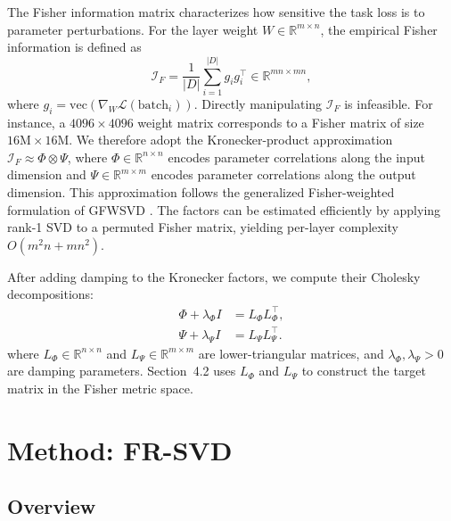 \documentclass[a4paper,fleqn]{cas-dc}
\begin{document}
The Fisher information matrix characterizes how sensitive the task loss is to parameter perturbations. For the layer weight $W \in \mathbb{R}^{m \times n}$, the empirical Fisher information is defined as
\begin{equation}
\mathcal{I}_F = \frac{1}{|D|} \sum_{i=1}^{|D|} g_i g_i^\top \in \mathbb{R}^{mn \times mn},
\end{equation}
where $g_i = \mathrm{vec}(\nabla_W \mathcal{L}(\mathrm{batch}_i))$. Directly manipulating $\mathcal{I}_F$ is infeasible. For instance, a $4096 \times 4096$ weight matrix corresponds to a Fisher matrix of size $16\text{M} \times 16\text{M}$. We therefore adopt the Kronecker-product approximation \citep{grosse2016kfac} $\mathcal{I}_F \approx \Phi \otimes \Psi$, where $\Phi \in \mathbb{R}^{n \times n}$ encodes parameter correlations along the input dimension and $\Psi \in \mathbb{R}^{m \times m}$ encodes parameter correlations along the output dimension. This approximation follows the generalized Fisher-weighted formulation of GFWSVD \citep{chekalina2025gfwsvd}. The factors can be estimated efficiently by applying rank-1 SVD to a permuted Fisher matrix, yielding per-layer complexity $O(m^2 n + mn^2)$.

After adding damping to the Kronecker factors, we compute their Cholesky decompositions:
\begin{equation}
\begin{aligned}
\Phi + \lambda_\Phi I &= L_\Phi L_\Phi^\top, \\
\Psi + \lambda_\Psi I &= L_\Psi L_\Psi^\top.
\end{aligned}
\label{eq:fisher-cholesky}
\end{equation}
where $L_\Phi \in \mathbb{R}^{n \times n}$ and $L_\Psi \in \mathbb{R}^{m \times m}$ are lower-triangular matrices, and $\lambda_\Phi, \lambda_\Psi > 0$ are damping parameters. Section~4.2 uses $L_\Phi$ and $L_\Psi$ to construct the target matrix in the Fisher metric space.

\section{Method: FR-SVD}

\subsection{Overview}
\end{document}
